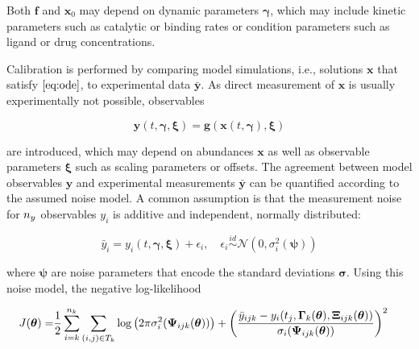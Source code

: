 \documentclass[11pt]{article}
\begin{document}
Both \(\textbf{f}\) and \(\textbf{x}_0\) may depend on dynamic
parameters \(\boldsymbol{\gamma}\), which may include kinetic parameters
such as catalytic or binding rates or condition parameters such as
ligand or drug concentrations.

Calibration is performed by comparing model simulations, i.e., solutions
\(\textbf{x}\) that satisfy \(\eqref{eq:ode}\), to experimental data
\(\bar{\textbf{y}}\). As direct measurement of \(\textbf{x}\) is usually
experimentally not possible, observables

\begin{equation}
\textbf{y}(t,\boldsymbol{\gamma},\boldsymbol{\xi}) = \textbf{g}(\textbf{x}(t,\boldsymbol{\gamma}),\boldsymbol{\xi})
\label{eq:observable}
\end{equation}

are introduced, which may depend on abundances \(\textbf{x}\) as well as
observable parameters \(\boldsymbol{\xi}\) such as scaling parameters or
offsets. The agreement between model observables \(\textbf{y}\) and
experimental measurements \(\bar{\textbf{y}}\) can be quantified
according to the assumed noise model. A common assumption is that the
measurement noise for \({n_{y}}\) observables \(y_i\) is additive and
independent, normally distributed:

\begin{equation}
\bar{y}_{i} = y_i(t,\boldsymbol{\gamma},\boldsymbol{\xi}) + \epsilon_{i}, \quad \epsilon_{i} \overset{id}{\sim} \mathcal{N}(0,\sigma_{i}^2(\boldsymbol{\psi}))
\label{eq:noise}
\end{equation}

where \(\boldsymbol{\psi}\) are noise parameters that encode the
standard deviations \(\boldsymbol{\sigma}\). Using this noise model, the
negative log-likelihood

\begin{equation}
\begin{aligned}
J(\boldsymbol{\theta}) =&  \frac{1}{2} \sum_{i=k}^{n_{k}} \sum_{(i,j) \in T_k} \log\left(2\pi\sigma_{i}^2(\boldsymbol{\Psi}_{ijk}(\boldsymbol{\theta}))\right) + \left(\frac{\bar{y}_{ijk} - y_{i}(t_j,\boldsymbol{\Gamma}_k(\boldsymbol{\theta}),\boldsymbol{\Xi}_{ijk}(\boldsymbol{\theta}))}{\sigma_{i}(\boldsymbol{\Psi}_{ijk}(\boldsymbol{\theta}))}\right)^2
\label{eq:objective}
\end{aligned}
\end{equation}
\end{document}
